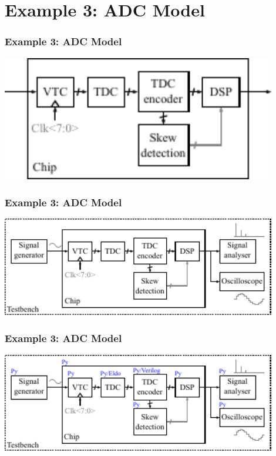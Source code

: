 \documentclass{sdkslides}
\newcommand{\sectname}{Section Name}
\begin{document}
\renewcommand{\sectname}{Example 3: ADC Model}
\section{\sectname} 
\begin{frame}[c]
    \frametitle{\sectname}
    \centering
    \includegraphics[width=0.9\textwidth]{Pics/sdk_model_0}
\end{frame}
\begin{frame}[c]
    \frametitle{\sectname}
    \centering
    \includegraphics[width=0.9\textwidth]{Pics/sdk_model_1}
\end{frame}

\begin{frame}[c]
    \frametitle{\sectname}
    \centering
    \includegraphics[width=0.9\textwidth]{Pics/sdk_model_2}
\end{frame}
\end{document}
